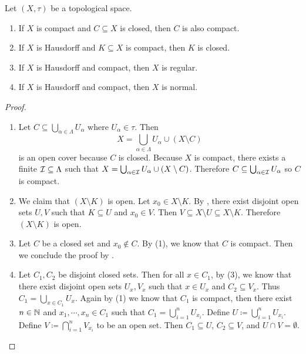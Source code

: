 \documentclass[screen]{techreport}
\numberwithin{equation}{section}
\begin{document}
\begin{proposition}\label{Prop:SeveralPropertiesOfCompactness}
	Let $(X,\tau)$ be a topological space.
	\begin{enumerate}
		\item If $X$ is compact and $C \subseteq X$ is closed, then $C$ is also compact.
		\item If $X$ is Hausdorff and $K \subseteq X$ is compact, then $K$ is closed.
		\item If $X$ is Hausdorff and compact, then $X$ is regular.
		\item If $X$ is Hausdorff and compact, then $X$ is normal.
	\end{enumerate}
\end{proposition}
\begin{proof}\
	\begin{enumerate}
		\item Let $C \subseteq \bigcup_{\alpha \in \Lambda} U_\alpha$ where $U_\alpha \in \tau$. Then
		\[
		X = \bigcup_{\alpha \in \Lambda} U_\alpha \cup (X \setminus C)
		\]
		is an open cover because $C$ is closed.
		Because $X$ is compact, there exists a finite $\mathcal{I} \subseteq \Lambda$ such that $X = \bigcup_{\alpha \in \mathcal{I}} U_\alpha \cup (X \setminus C)$.
		Therefore $C \subseteq \bigcup_{\alpha \in \mathcal{I}} U_\alpha$ so $C$ is compact.
		
		\item We claim that $(X \setminus K)$ is open.
		Let $x_0 \in X \setminus K$.
		By , there exist disjoint open sets $U,V$ such that $K \subseteq U$ and $x_0 \in V$.
		Then $V \subseteq X \setminus U \subseteq X \setminus K$.
		Therefore $(X \setminus K)$ is open.
		
		\item Let $C$ be a closed set and $x_0 \not\in C$.
		By (1), we know that $C$ is compact.
		Then we conclude the proof by .
		
		\item Let $C_1,C_2$ be disjoint closed sets.
		Then for all $x \in C_1$, by (3), we know that there exist disjoint open sets $U_x,V_x$ such that $x \in U_x$ and $C_2 \subseteq V_x$.
		Thus $C_1 = \bigcup_{x \in C_1} U_x$.
		Again by (1) we know that $C_1$ is compact, then there exist $n \in \mathbb{N}$ and $x_1,\cdots,x_n \in C_1$ such that $C_1 = \bigcup_{i=1}^n U_{x_i}$.
		Define $U \coloneqq \bigcup_{i=1}^n U_{x_i}$.
		Define $V \coloneqq \bigcap_{i=1}^n V_{x_i}$ to be an open set.
		Then $C_1 \subseteq U$, $C_2 \subseteq V$, and $U \cap V =\emptyset$.
	\end{enumerate}
\end{proof}
\end{document}
